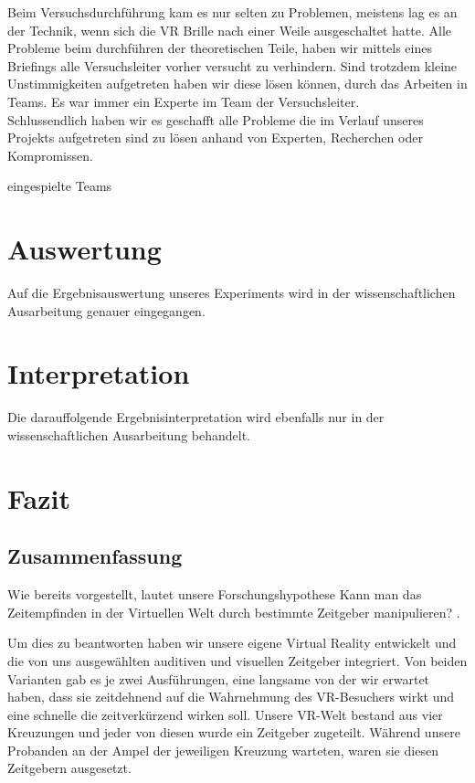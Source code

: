 \documentclass{Bericht}
\begin{document}
Beim Versuchsdurchführung kam es nur selten zu Problemen, meistens lag es an der Technik, wenn sich die VR Brille nach einer Weile ausgeschaltet hatte. Alle Probleme beim durchführen der theoretischen Teile, haben wir mittels eines Briefings alle Versuchsleiter vorher versucht zu verhindern. Sind trotzdem kleine Unstimmigkeiten aufgetreten haben wir diese lösen können, durch das Arbeiten in Teams. Es war immer ein Experte im Team der Versuchsleiter. \\
Schlussendlich haben wir es geschafft alle Probleme die im Verlauf unseres Projekts aufgetreten sind zu lösen anhand von Experten, Recherchen oder Kompromissen.

eingespielte Teams

\section{Auswertung} %
	Auf die Ergebnisauswertung unseres Experiments wird in der wissenschaftlichen Ausarbeitung genauer eingegangen.

\section{Interpretation} %
	Die darauffolgende Ergebnisinterpretation  wird ebenfalls nur in der wissenschaftlichen Ausarbeitung behandelt.
	
\section{Fazit} %

\subsection{Zusammenfassung}
Wie bereits vorgestellt, lautet unsere Forschungshypothese \glqq Kann man das Zeitempfinden in der Virtuellen Welt durch bestimmte Zeitgeber manipulieren?\glqq{} .

Um dies zu beantworten haben wir unsere eigene Virtual Reality entwickelt und die von uns ausgewählten auditiven und visuellen Zeitgeber integriert. Von beiden Varianten gab es je zwei Ausführungen, eine langsame von der wir erwartet haben, dass sie zeitdehnend auf die Wahrnehmung des VR-Besuchers wirkt und eine schnelle die zeitverkürzend wirken soll. Unsere VR-Welt bestand aus vier Kreuzungen und jeder von diesen wurde ein Zeitgeber zugeteilt. Während unsere Probanden an der Ampel der jeweiligen Kreuzung warteten, waren sie diesen Zeitgebern ausgesetzt. 
\end{document}
